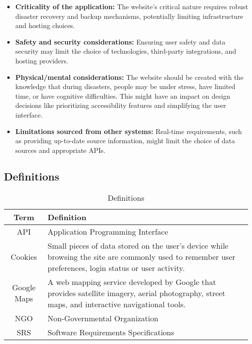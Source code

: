 \documentclass[11pt,a4paper]{article}
\begin{document}
\begin{itemize}
    \item \textbf{Criticality of the application:} The website's critical nature requires robust disaster recovery and backup mechanisms, potentially limiting infrastructure and hosting choices.
    \item \textbf{Safety and security considerations:} Ensuring user safety and data security may limit the choice of technologies, third-party integrations, and hosting providers.
    \item \textbf{Physical/mental considerations:} The website should be created with the knowledge that during disasters, people may be under stress, have limited time, or have cognitive difficulties. This might have an impact on design decisions like prioritizing accessibility features and simplifying the user interface.
    \item \textbf{Limitations sourced from other systems:} Real-time requirements, such as providing up-to-date source information, might limit the choice of data sources and appropriate APIs.
\end{itemize}

\newpage

\subsection{Definitions}
\begin{table}[H]
    \centering
    \begin{tabular}{|c|p{11cm}|}
        \hline
        Term & Definition \\
        \hline
        API & Application Programming Interface \\
        \hline
        Cookies & Small pieces of data stored on the user's device while browsing the site are commonly used to remember user preferences, login status or user activity. \\
        \hline
        Google Maps & A web mapping service developed by Google that provides satellite imagery, aerial photography, street maps, and interactive navigational tools. \\
        \hline
        NGO & Non-Governmental Organization \\
        \hline
        SRS & Software Requirements Specifications \\
        \hline
    \end{tabular}
    \caption{Definitions}
    \label{Definitions}
\end{table}

\newpage
\end{document}
